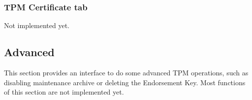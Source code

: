 \documentclass[
  american        %
]{sirrixreport}
\begin{document}
\subsubsection{TPM Certificate tab} Not implemented yet.

\subsection{Advanced} This section provides an interface to do some advanced TPM operations, such as disabling maintenance archive or deleting the Endorsement Key. Most functions of this section are not implemented yet.




\end{document}
